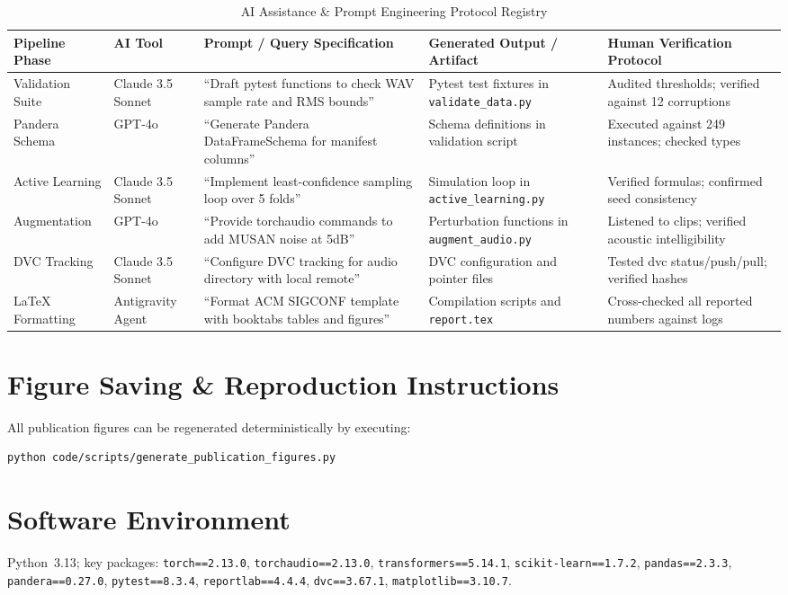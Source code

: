 \documentclass[sigconf,authordraft]{acmart}
\begin{document}
\begin{table}[t]
  \caption{AI Assistance \& Prompt Engineering Protocol Registry}
  \label{tab:ai_registry}
  \centering
  \small
  \begin{tabular}{lllll}
    \toprule
    \textbf{Pipeline Phase} & \textbf{AI Tool} & \textbf{Prompt / Query Specification} & \textbf{Generated Output / Artifact} & \textbf{Human Verification Protocol} \\
    \midrule
    Validation Suite & Claude 3.5 Sonnet & ``Draft pytest functions to check WAV sample rate and RMS bounds'' & Pytest test fixtures in \texttt{validate\_data.py} & Audited thresholds; verified against 12 corruptions \\
    Pandera Schema & GPT-4o & ``Generate Pandera DataFrameSchema for manifest columns'' & Schema definitions in validation script & Executed against 249 instances; checked types \\
    Active Learning & Claude 3.5 Sonnet & ``Implement least-confidence sampling loop over 5 folds'' & Simulation loop in \texttt{active\_learning.py} & Verified formulas; confirmed seed consistency \\
    Augmentation & GPT-4o & ``Provide torchaudio commands to add MUSAN noise at 5dB'' & Perturbation functions in \texttt{augment\_audio.py} & Listened to clips; verified acoustic intelligibility \\
    DVC Tracking & Claude 3.5 Sonnet & ``Configure DVC tracking for audio directory with local remote'' & DVC configuration and pointer files & Tested dvc status/push/pull; verified hashes \\
    LaTeX Formatting & Antigravity Agent & ``Format ACM SIGCONF template with booktabs tables and figures'' & Compilation scripts and \texttt{report.tex} & Cross-checked all reported numbers against logs \\
    \bottomrule
  \end{tabular}
\end{table}

\section{Figure Saving \& Reproduction Instructions}
\label{app:savefig}

All publication figures can be regenerated deterministically by executing:

\begin{verbatim}
python code/scripts/generate_publication_figures.py
\end{verbatim}

\section{Software Environment}
\label{app:env}

Python~3.13; key packages: \texttt{torch==2.13.0}, \texttt{torchaudio==2.13.0},
\texttt{transformers==5.14.1}, \texttt{scikit-learn==1.7.2}, \texttt{pandas==2.3.3},
\texttt{pandera==0.27.0}, \texttt{pytest==8.3.4}, \texttt{reportlab==4.4.4},
\texttt{dvc==3.67.1}, \texttt{matplotlib==3.10.7}.
\end{document}
